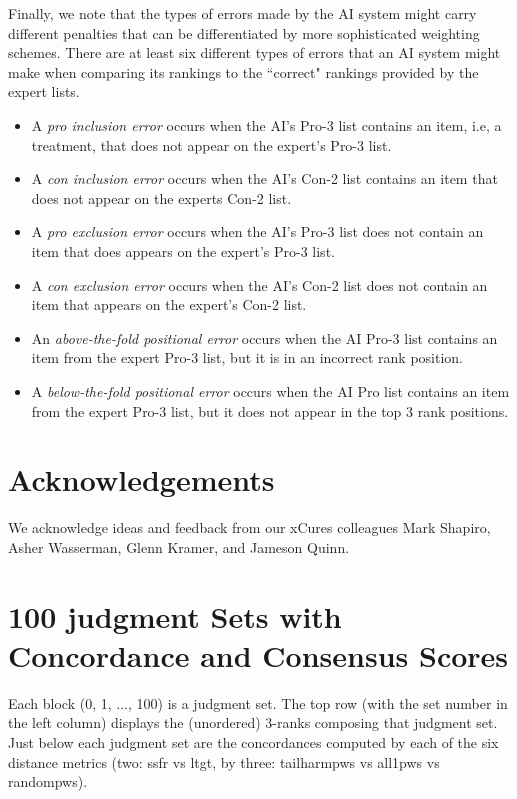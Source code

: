 \documentclass{article}
\begin{document}
Finally, we note that the types of errors made by the AI system might carry different penalties that can be differentiated by more sophisticated weighting schemes. There are at least six different types of errors that an AI system might make when comparing its rankings to the ``correct" rankings provided by the expert lists. 
\begin{itemize}
    \item A \emph{pro inclusion error} occurs when the AI's Pro-3 list contains an item, i.e, a treatment, that does not appear on the expert's Pro-3 list.
    \item A \emph{con inclusion error} occurs when the AI's Con-2 list contains an item that does not appear on the experts Con-2 list.
    \item A \emph{pro exclusion error} occurs when the AI's Pro-3 list does not contain an item that does appears on the expert's Pro-3 list.
    \item A \emph{con exclusion error} occurs when the AI's Con-2 list does not contain an item that appears on the expert's Con-2 list.
    \item An \emph{above-the-fold positional error} occurs when the AI Pro-3 list contains an item from the expert Pro-3 list, but it is in an incorrect rank position.
    \item A \emph{below-the-fold positional error} occurs when the AI Pro list contains an item from the expert Pro-3 list, but it does not appear in the top 3 rank positions.
\end{itemize}

\newpage
\section{Acknowledgements}

We acknowledge ideas and feedback from our xCures colleagues Mark Shapiro, Asher Wasserman, Glenn Kramer, and Jameson Quinn.


\newpage



\newpage
\appendix
\singlespacing

\section{100 judgment Sets with Concordance and Consensus Scores}

Each block (0, 1, ..., 100) is a judgment set. The top row (with the set number in the left column) displays the (unordered) 3-ranks composing that judgment set. Just below each judgment set are the concordances computed by each of the six distance metrics (two: ssfr vs ltgt, by three: tailharmpws vs all1pws vs randompws). 
\end{document}
